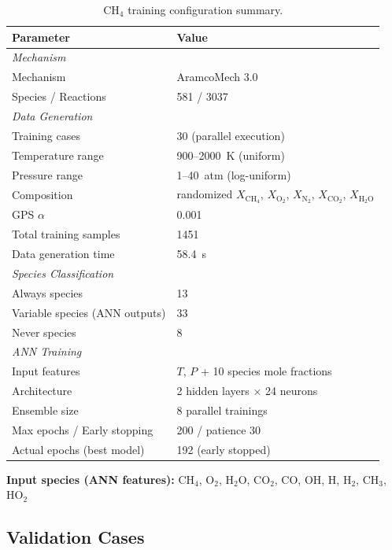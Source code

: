 \documentclass[11pt,a4paper]{article}
\begin{document}
\begin{table}[H]
\centering
\caption{CH$_4$ training configuration summary.}
\label{tab:ch4_config}
\begin{tabular}{ll}
\toprule
\textbf{Parameter} & \textbf{Value} \\
\midrule
\multicolumn{2}{l}{\textit{Mechanism}} \\
\quad Mechanism & AramcoMech 3.0 \\
\quad Species / Reactions & 581 / 3037 \\
\midrule
\multicolumn{2}{l}{\textit{Data Generation}} \\
\quad Training cases & 30 (parallel execution) \\
\quad Temperature range & 900--2000~K (uniform) \\
\quad Pressure range & 1--40~atm (log-uniform) \\
\quad Composition & randomized $X_{\text{CH}_4}$, $X_{\text{O}_2}$, $X_{\text{N}_2}$, $X_{\text{CO}_2}$, $X_{\text{H}_2\text{O}}$ \\
\quad GPS $\alpha$ & 0.001 \\
\quad Total training samples & 1451 \\
\quad Data generation time & 58.4~s \\
\midrule
\multicolumn{2}{l}{\textit{Species Classification}} \\
\quad Always species & 13 \\
\quad Variable species (ANN outputs) & 33 \\
\quad Never species & 8 \\
\midrule
\multicolumn{2}{l}{\textit{ANN Training}} \\
\quad Input features & $T$, $P$ + 10 species mole fractions \\
\quad Architecture & 2 hidden layers $\times$ 24 neurons \\
\quad Ensemble size & 8 parallel trainings \\
\quad Max epochs / Early stopping & 200 / patience 30 \\
\quad Actual epochs (best model) & 192 (early stopped) \\
\bottomrule
\end{tabular}
\end{table}

\textbf{Input species (ANN features):} CH$_4$, O$_2$, H$_2$O, CO$_2$, CO, OH, H, H$_2$, CH$_3$, HO$_2$

\subsection{Validation Cases}
\end{document}
